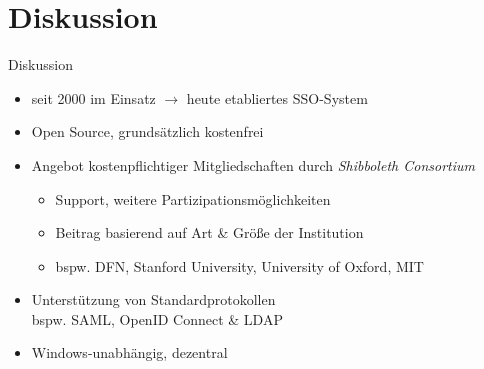 
\section{Diskussion}

\begin{frame}{Diskussion}
    \begin{itemize}
        \item seit 2000 im Einsatz $\to$ heute etabliertes SSO-System~\cite{shibbolethShibbolethConsortium2024}
        
        \pause

        \item Open Source, grundsätzlich kostenfrei~\cite{shibbolethMembership}
        \item Angebot kostenpflichtiger Mitgliedschaften durch \emph{Shibboleth Consortium}~\cite{shibbolethShibbolethConsortium2024, shibbolethMembership}
        \begin{itemize}
            \item Support, weitere Partizipationsmöglichkeiten
            \item Beitrag basierend auf Art \& Größe der Institution~\cite{shibbolethShibbolethConsortium2024, shibbolethMembership}
            \item bspw. DFN, Stanford University, University of Oxford, MIT~\cite{shibbolethOurMembers2024}
        \end{itemize}

        \pause

        \item Unterstützung von Standardprotokollen\\
            bspw. SAML, OpenID Connect \& LDAP~\cite{cantorConsortiumFAQShibboleth2023, overtsoftwareAzureADADFS2022}
        \item Windows-unabhängig, dezentral~\cite{overtsoftwareAzureADADFS2022}
    \end{itemize}
\end{frame}


